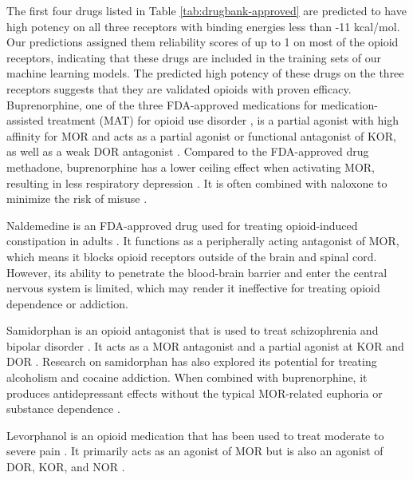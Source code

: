 \documentclass[10pt]{article}
\begin{document}
		
		The first four drugs listed in Table \ref{tab:drugbank-approved} are predicted to have high potency on all three receptors with binding energies less than -11 kcal/mol. Our predictions assigned them reliability scores of up to 1 on most of the opioid receptors, indicating that these drugs are included in the training sets of our machine learning models. The predicted high potency of these drugs on the three receptors suggests that they are validated opioids with proven efficacy. Buprenorphine, one of the three FDA-approved medications for medication-assisted treatment (MAT) for opioid use disorder \cite{bell2020medication}, is a partial agonist with high affinity for MOR and acts as a partial agonist or functional antagonist of KOR, as well as a weak DOR antagonist \cite{wang2019historical}. Compared to the FDA-approved drug methadone, buprenorphine has a lower ceiling effect when activating MOR, resulting in less respiratory depression \cite{wang2019historical}. It is often combined with naloxone to minimize the risk of misuse \cite{koehl2019medications}.
		
		Naldemedine is an FDA-approved drug used for treating opioid-induced constipation in adults \cite{hu2018naldemedine}. It functions as a peripherally acting antagonist of MOR, which means it blocks opioid receptors outside of the brain and spinal cord. However, its ability to penetrate the blood-brain barrier and enter the central nervous system is limited, which may render it ineffective for treating opioid dependence or addiction.
		
		Samidorphan is an opioid antagonist that is used to treat schizophrenia and bipolar disorder \cite{chaudhary2019review}. It acts as a MOR antagonist and a partial agonist at KOR and DOR \cite{bidlack2018vitro}. Research on samidorphan has also explored its potential for treating alcoholism and cocaine addiction. When combined with buprenorphine, it produces antidepressant effects without the typical MOR-related euphoria or substance dependence \cite{dhir2017investigational}.
		
		
		Levorphanol is an opioid medication that has been used to treat moderate to severe pain \cite{elks2014dictionary}. It primarily acts as an agonist of MOR but is also an agonist of DOR, KOR, and NOR \cite{gudin2016levorphanol}.
		
\end{document}
